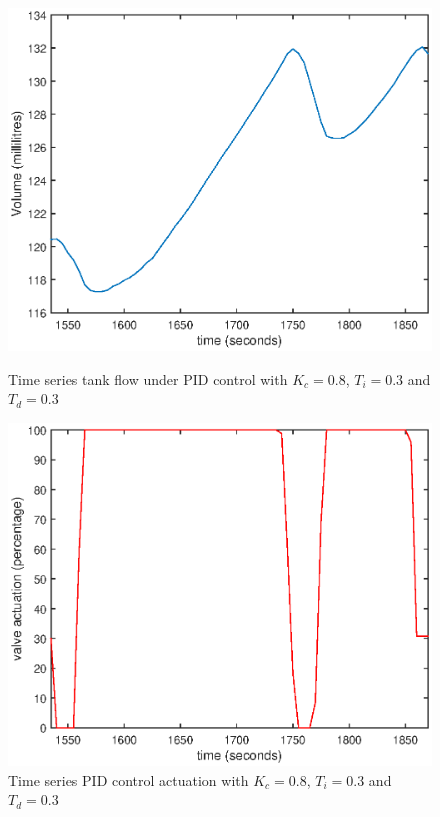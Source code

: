 \documentclass{article}
\begin{document}
\begin{figure}[h]
	\centering
	\begin{minipage}{0.45\textwidth}
		\centering
		\includegraphics[scale=0.4]{PID_Kc_08_Ti_03_Td_03}
		\caption{Time series tank flow under PID control with $K_c = 0.8$, $T_i = 0.3$ and $T_d = 0.3$}
	\end{minipage}
	\hspace{0.5cm}
	\begin{minipage}{0.45\textwidth}
		\centering
		\includegraphics[scale=0.4]{PID_Kc_08_Ti_03_Td_03_control}
		\caption{Time series PID control actuation with $K_c = 0.8$, $T_i = 0.3$ and $T_d = 0.3$}
	\end{minipage}
\end{figure}
\end{document}
